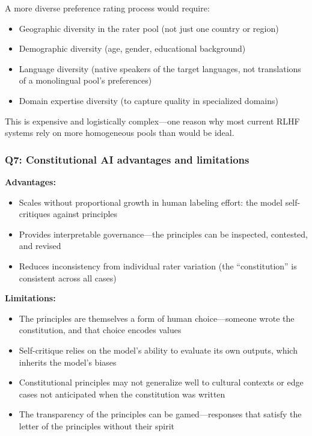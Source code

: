 A more diverse preference rating process would require:
\begin{itemize}
    \item Geographic diversity in the rater pool (not just one country or region)
    \item Demographic diversity (age, gender, educational background)
    \item Language diversity (native speakers of the target languages, not translations of a monolingual pool's preferences)
    \item Domain expertise diversity (to capture quality in specialized domains)
\end{itemize}

This is expensive and logistically complex---one reason why most current RLHF systems rely on more homogeneous pools than would be ideal.

\subsubsection*{Q7: Constitutional AI advantages and limitations}

\textbf{Advantages:}
\begin{itemize}
    \item Scales without proportional growth in human labeling effort: the model self-critiques against principles
    \item Provides interpretable governance---the principles can be inspected, contested, and revised
    \item Reduces inconsistency from individual rater variation (the ``constitution'' is consistent across all cases)
\end{itemize}

\textbf{Limitations:}
\begin{itemize}
    \item The principles are themselves a form of human choice---someone wrote the constitution, and that choice encodes values
    \item Self-critique relies on the model's ability to evaluate its own outputs, which inherits the model's biases
    \item Constitutional principles may not generalize well to cultural contexts or edge cases not anticipated when the constitution was written
    \item The transparency of the principles can be gamed---responses that satisfy the letter of the principles without their spirit
\end{itemize}

